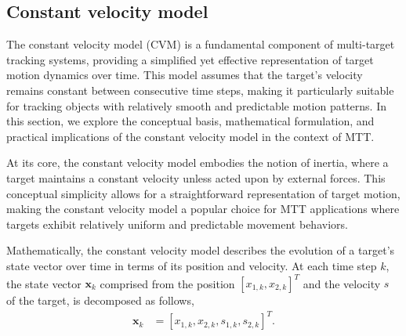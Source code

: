    \subsection{Constant velocity model}
The constant velocity model (CVM) is a fundamental component of multi-target tracking systems, providing a simplified yet effective representation of target motion dynamics over time. This model assumes that the target's velocity remains constant between consecutive time steps, making it particularly suitable for tracking objects with relatively smooth and predictable motion patterns. In this section, we explore the conceptual basis, mathematical formulation, and practical implications of the constant velocity model in the context of MTT.

At its core, the constant velocity model embodies the notion of inertia, where a target maintains a constant velocity unless acted upon by external forces. This conceptual simplicity allows for a straightforward representation of target motion, making the constant velocity model a popular choice for MTT applications where targets exhibit relatively uniform and predictable movement behaviors.

Mathematically, the constant velocity model describes the evolution of a target's state vector over time in terms of
its position and velocity. At each time step $k$, the state vector $\mathbf{x}_k$ comprised from the position $[x_{1,
k},x_{
    2,k}]^T$ and the velocity $s$ of the target, is decomposed as follows,
\begin{align}
    \mathbf{x}_k &= [x_{1,k}, x_{2,k}, s_{1,k}, s_{2,k}]^T.
\end{align}

